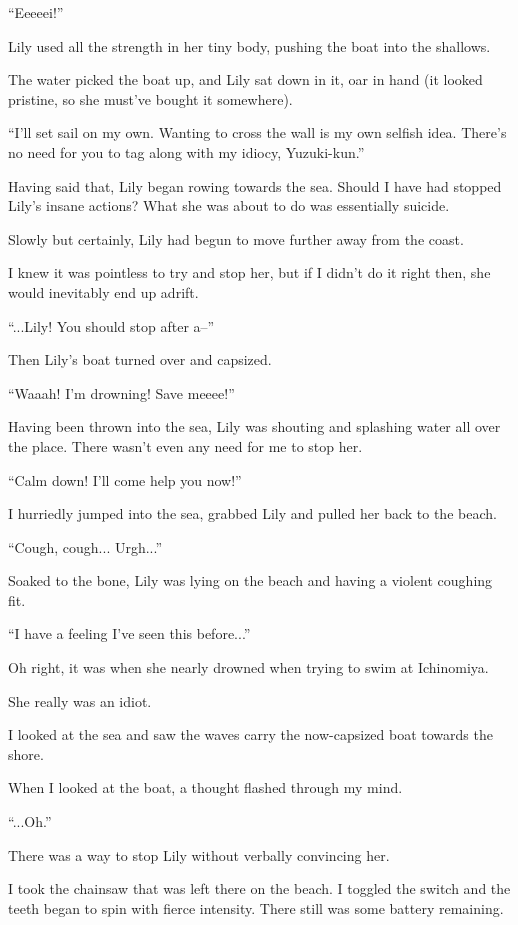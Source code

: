 ``Eeeeei!''

Lily used all the strength in her tiny body, pushing the boat into the shallows.

The water picked the boat up, and Lily sat down in it, oar in hand (it looked pristine, so she must've bought it somewhere).

``I'll set sail on my own. Wanting to cross the wall is my own selfish idea. There's no need for you to tag along with my idiocy, Yuzuki-kun.''

Having said that, Lily began rowing towards the sea. Should I have had stopped Lily's insane actions? What she was about to do was essentially suicide.

Slowly but certainly, Lily had begun to move further away from the coast.

I knew it was pointless to try and stop her, but if I didn't do it right then, she would inevitably end up adrift.

``...Lily! You should stop after a--''

Then Lily's boat turned over and capsized.

``Waaah! I'm drowning! Save meeee!''

Having been thrown into the sea, Lily was shouting and splashing water all over the place. There wasn't even any need for me to stop her.

``Calm down! I'll come help you now!''

I hurriedly jumped into the sea, grabbed Lily and pulled her back to the beach.

``Cough, cough... Urgh...''

Soaked to the bone, Lily was lying on the beach and having a violent coughing fit.

``I have a feeling I've seen this before...''

Oh right, it was when she nearly drowned when trying to swim at Ichinomiya.

She really was an idiot.

I looked at the sea and saw the waves carry the now-capsized boat towards the shore.

When I looked at the boat, a thought flashed through my mind.

``...Oh.''

There was a way to stop Lily without verbally convincing her.

I took the chainsaw that was left there on the beach. I toggled the switch and the teeth began to spin with fierce intensity. There still was some battery remaining.


